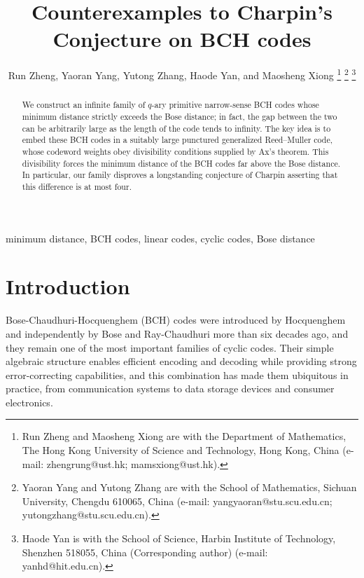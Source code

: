 \documentclass[journal,onecolumn]{IEEEtran}
\begin{document}
\title{Counterexamples to Charpin's Conjecture on BCH codes}
\author{Run Zheng, Yaoran Yang, Yutong Zhang, Haode Yan, and Maosheng Xiong%
\thanks{Run Zheng and Maosheng Xiong are with the Department of Mathematics,
The Hong Kong University of Science and Technology, Hong Kong, China
(e-mail: zhengrung@ust.hk; mamsxiong@ust.hk).}%
\thanks{Yaoran Yang and Yutong Zhang are with the School of Mathematics,
Sichuan University, Chengdu 610065, China
(e-mail: yangyaoran@stu.scu.edu.cn; yutongzhang@stu.scu.edu.cn).}
\thanks{Haode Yan is with the School of Science, Harbin Institute of Technology,
Shenzhen 518055, China (Corresponding author)
(e-mail: yanhd@hit.edu.cn).} }









\maketitle


    \begin{abstract}
We construct an infinite family of $q$-ary primitive narrow-sense BCH codes whose minimum distance strictly exceeds the Bose distance; in fact, the gap between the two can be arbitrarily large as the length of the code tends to infinity. The key idea is to embed these BCH codes in a suitably large punctured generalized Reed--Muller code, whose codeword weights obey divisibility conditions supplied by Ax's theorem. This divisibility forces the minimum distance of the BCH codes far above the Bose distance.
In particular, our family disproves a longstanding conjecture of Charpin asserting that this difference is at most four.
\end{abstract}





\begin{IEEEkeywords}
minimum distance, BCH codes, linear codes, cyclic codes, Bose distance
\end{IEEEkeywords}




\section{Introduction}
Bose-Chaudhuri-Hocquenghem (BCH) codes were introduced
by Hocquenghem \cite{Hocquenghem1959} and independently by Bose and Ray-Chaudhuri \cite{BoseRayChaudhuri1960} more than six decades ago, and they remain one of the most important families of cyclic codes. Their simple algebraic structure enables efficient encoding and decoding while providing strong error-correcting capabilities, and this combination has made them ubiquitous in practice, from communication systems to data storage devices and consumer electronics. 
\end{document}
